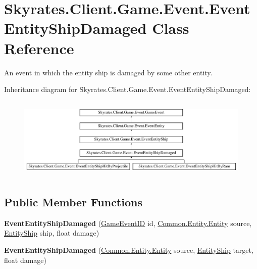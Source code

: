\hypertarget{class_skyrates_1_1_client_1_1_game_1_1_event_1_1_event_entity_ship_damaged}{\section{Skyrates.\-Client.\-Game.\-Event.\-Event\-Entity\-Ship\-Damaged Class Reference}
\label{class_skyrates_1_1_client_1_1_game_1_1_event_1_1_event_entity_ship_damaged}
}


An event in which the entity ship is damaged by some other entity.  


Inheritance diagram for Skyrates.\-Client.\-Game.\-Event.\-Event\-Entity\-Ship\-Damaged\-:\begin{figure}[H]
\begin{center}
\leavevmode
\includegraphics[height=3.977273cm]{class_skyrates_1_1_client_1_1_game_1_1_event_1_1_event_entity_ship_damaged}
\end{center}
\end{figure}
\subsection*{Public Member Functions}
\begin{DoxyCompactItemize}
\item 
\hypertarget{class_skyrates_1_1_client_1_1_game_1_1_event_1_1_event_entity_ship_damaged_a18f90ff076ba51a0167f4aac10a225cb}{{\bfseries Event\-Entity\-Ship\-Damaged} (\hyperlink{namespace_skyrates_1_1_client_1_1_game_1_1_event_a3a7e5dc62ad299d5e53abb4a3e5d5088}{Game\-Event\-I\-D} id, \hyperlink{class_skyrates_1_1_common_1_1_entity_1_1_entity}{Common.\-Entity.\-Entity} source, \hyperlink{class_skyrates_1_1_client_1_1_entity_1_1_entity_ship}{Entity\-Ship} ship, float damage)}\label{class_skyrates_1_1_client_1_1_game_1_1_event_1_1_event_entity_ship_damaged_a18f90ff076ba51a0167f4aac10a225cb}

\item 
\hypertarget{class_skyrates_1_1_client_1_1_game_1_1_event_1_1_event_entity_ship_damaged_a4e157052f0469f3f334d7585bf9023e7}{{\bfseries Event\-Entity\-Ship\-Damaged} (\hyperlink{class_skyrates_1_1_common_1_1_entity_1_1_entity}{Common.\-Entity.\-Entity} source, \hyperlink{class_skyrates_1_1_client_1_1_entity_1_1_entity_ship}{Entity\-Ship} target, float damage)}\label{class_skyrates_1_1_client_1_1_game_1_1_event_1_1_event_entity_ship_damaged_a4e157052f0469f3f334d7585bf9023e7}

\end{DoxyCompactItemize}
